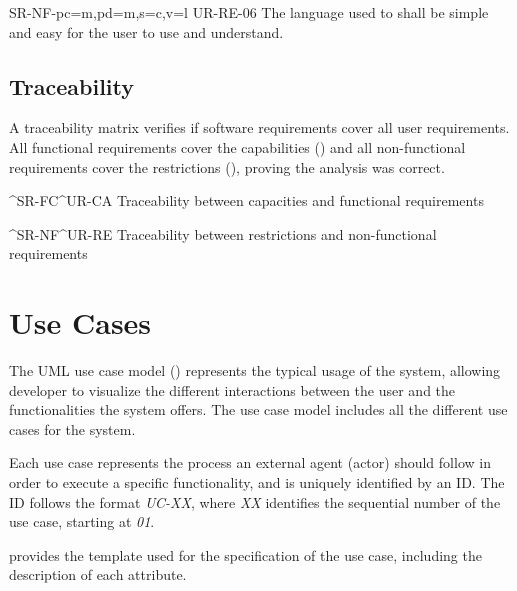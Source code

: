 \begin{softwareReq}{SR-NF-}{pc=m,pd=m,s=c,v=l}
  {UR-RE-06}
  The language used to shall be simple and easy for the user to use and understand.
\end{softwareReq}

\FloatBarrier


\subsection{Traceability}\label{subsec:req-traceability}
A traceability matrix verifies if software requirements cover all user requirements. All functional requirements cover the capabilities () and all non-functional requirements cover the restrictions (), proving the analysis was correct.

  {^SR-FC}{^UR-CA}
  {Traceability between capacities and functional requirements}

  {^SR-NF}{^UR-RE}
  {Traceability between restrictions and non-functional requirements}


\FloatBarrier


\section{Use Cases}\label{sec:use-cases}
The UML use case model \parencite{Cook2017} () represents the typical usage of the system, allowing developer to visualize the different interactions between the user and the functionalities the system offers. The use case model includes all the different use cases for the system.


Each use case represents the process an external agent (actor) should follow in order to execute a specific functionality, and is uniquely identified by an ID. The ID follows the format \textit{UC-XX}, where \textit{XX} identifies the sequential number of the use case, starting at \textit{01}.

 provides the template used for the specification of the use case, including the description of each attribute.

